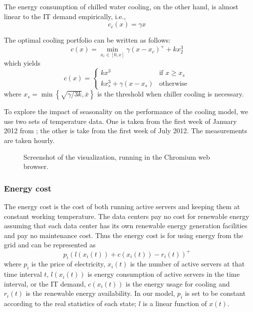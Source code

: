 \documentclass{acm_proc_article-sp}
\begin{document}
The energy consumption of chilled water cooling, on the other hand, is almost linear to the IT demand empirically, i.e.,
\begin{equation}
c_c(x) = \gamma x
\end{equation}

The optimal cooling portfolio can be written as follows:
\begin{equation}
c(x) = \min_{x_c \in [0,x]} \gamma(x-x_c)^+ + kx_2^3
\end{equation}
which yields
$$
c(x) = \left\{ \begin{array}{ll}
	kx^3 & \mbox{if $x \geq x_s$}\\
	kx_s^3 + \gamma (x-x_s) & \mbox{otherwise}\end{array} \right.
$$
where $x_s = \min \left\{\sqrt{\gamma/3k}, \bar{x}\right\}$ is the threshold when chiller cooling is necessary.

To explore the impact of seasonality on the performance of the cooling model, we use two sets of temperature data. One is taken from the first week of January 2012 from \cite{temp}; the other is take from the first week of July 2012. The measurements are taken hourly.

\begin{figure*}
\centering
{}
\caption{Screenshot of the visualization, running in the Chromium web browser.}
\end{figure*}
\subsubsection{Energy cost}
The energy cost is the cost of both running active servers and keeping them at constant working temperature. The data centers pay no cost for renewable energy assuming that each data center has its own renewable energy generation facilities and pay no maintenance cost. Thus the energy cost is for using energy from the grid and can be represented as
\begin{equation}
p_i(l(x_i(t)) + c(x_i(t)) - r_i(t))^+
\end{equation}
where $p_i$ is the price of electricity, $x_i(t)$ is the number of active servers at that time interval $t$, $l(x_i(t))$ is energy consumption of active servers in the time interval, or the IT demand, $c(x_i(t))$ is the energy usage for cooling and $r_i(t)$ is the renewable energy availability. In our model, $p_i$ is set to be constant according to the real statistics of each state; $l$ is a linear function of $x(t)$.
\end{document}

